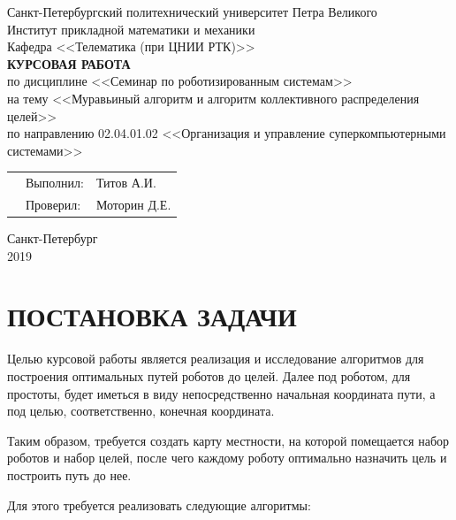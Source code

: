 \documentclass{article}
\numberwithin{equation}{section}
\begin{document}
    \thispagestyle{empty}
	\begin{center}
		Санкт-Петербургский политехнический университет Петра Великого\\
		Институт прикладной математики и механики\\
		Кафедра <<Телематика (при ЦНИИ РТК)>>\\
		\vspace*{\fill}
		\textbf{\Large{КУРСОВАЯ РАБОТА}}\\
		\vspace{0.5cm}
        \large{по дисциплине <<Семинар по роботизированным системам>>\\}
        \large{на тему <<Муравьиный алгоритм и алгоритм коллективного распределения целей>>}\\
        \vspace{1cm}
        по направлению 02.04.01.02 <<Организация и управление суперкомпьютерными системами>>
	\end{center}
	\vspace{3cm}
	\begin{tabular} {l l l}
	\hspace{10cm} & Выполнил: & Титов А.И.\\
	& Проверил: & Моторин Д.Е.
	\end{tabular}
	\vspace*{\fill}
	\begin{center}
		Санкт-Петербург\\
		2019
    \end{center}
    \newpage


	\renewcommand\contentsname{Оглавление}
	\tableofcontents

	\newpage
	\section*{ПОСТАНОВКА ЗАДАЧИ}

	Целью курсовой работы является реализация и исследование алгоритмов для построения оптимальных путей роботов до целей. Далее под роботом, для простоты, будет иметься в виду непосредственно начальная координата пути, а под целью, соответственно, конечная координата.

	Таким образом, требуется создать карту местности, на которой помещается набор роботов и набор целей, после чего каждому роботу оптимально назначить цель и построить путь до нее.

	Для этого требуется реализовать следующие алгоритмы:
\end{document}
